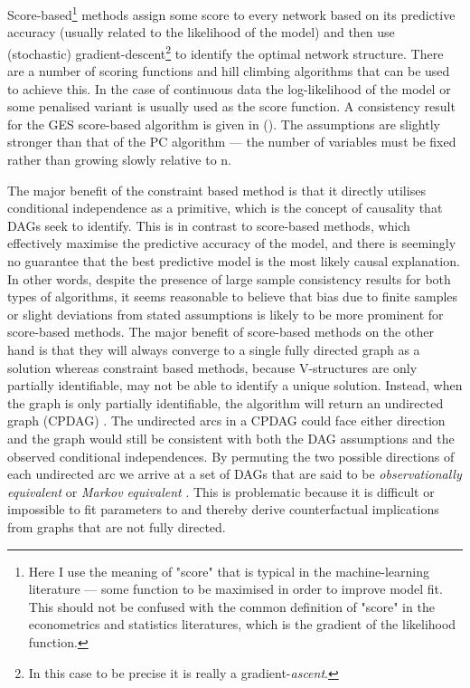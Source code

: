 \documentclass{article}
\begin{document}
Score-based\footnote{Here I use the meaning of "score" that is typical in the machine-learning literature --- some function to be maximised in order to improve model fit. This should not be confused with the common definition of "score" in the econometrics and statistics literatures, which is the gradient of the likelihood function.} methods assign some score to every network based on its predictive accuracy (usually related to the likelihood of the model) and then use (stochastic) gradient-descent\footnote{In this case to be precise it is really a gradient-\textit{ascent}.} to identify the optimal network structure. There are a number of scoring functions and hill climbing algorithms that can be used to achieve this. In the case of continuous data the log-likelihood of the model or some penalised variant is usually used as the score function. A consistency result for the GES score-based algorithm is given in \citeauthor{chickering2002optimal} (\citeyear{chickering2002optimal}). The assumptions are slightly stronger than that of the PC algorithm --- the number of variables must be fixed rather than growing slowly relative to n.

The major benefit of the constraint based method is that it directly utilises conditional independence as a primitive, which is the concept of causality that DAGs seek to identify. This is in contrast to score-based methods, which effectively maximise the predictive accuracy of the model, and there is seemingly no guarantee that the best predictive model is the most likely causal explanation. In other words, despite the presence of large sample consistency results for both types of algorithms, it seems reasonable to believe that bias due to finite samples or slight deviations from stated assumptions is likely to be more prominent for score-based methods. The major benefit of score-based methods on the other hand is that they will always converge to a single fully directed graph as a solution whereas constraint based methods, because V-structures are only partially identifiable, may not be able to identify a unique solution. Instead, when the graph is only partially identifiable, the algorithm will return an undirected graph (CPDAG) \parencite{spirtes1991algorithm}. The undirected arcs in a CPDAG could face either direction and the graph would still be consistent with both the DAG assumptions and the observed conditional independences. By permuting the two possible directions of each undirected arc we arrive at a set of DAGs that are said to be \textit{observationally equivalent} or \textit{Markov equivalent} \parencite{colombo2014order}. This is problematic because it is difficult or impossible to fit parameters to and thereby derive counterfactual implications from graphs that are not fully directed.  
\end{document}
